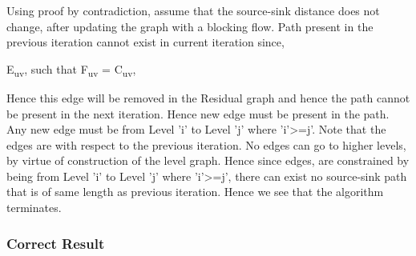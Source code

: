 \documentclass[paper=a4, fontsize=11pt]{scrartcl} %
\numberwithin{equation}{section} %
\numberwithin{figure}{section} %
\numberwithin{table}{section} %
\begin{document}
Using proof by contradiction, assume that the source-sink distance does not change, after updating the graph with a blocking flow. Path present in the previous iteration cannot exist in current iteration since,

\vspace{5mm}
\exists E\textsubscript{uv}, such that F\textsubscript{uv} = C\textsubscript{uv},

\vspace{5mm}

Hence this edge will be removed in the Residual graph and hence the path cannot be present in the next iteration.
Hence new edge must be present in the path. Any new edge must be from Level 'i' to Level 'j' where 'i'>=j'. Note that the edges are with respect to the previous iteration. No edges can go to higher levels, by virtue of construction of the level graph. Hence since edges, are constrained by being from Level 'i' to Level 'j' where 'i'>=j', there can exist no source-sink path that is of same length as previous iteration. Hence we see that the algorithm terminates.


\subsubsection{Correct Result}





\end{document}
